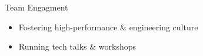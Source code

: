 \documentclass[a4paper,10pt]{article}
\newcommand{\subskill}[1]{{\color{vlightblue} #1}}
\begin{document}
{\begin{minipage}[t]{0.24\textwidth}
{\begin{minipage}[t][\textheight]{\dimexpr\textwidth-10pt}



        \subskill{Team Engagment}
        \begin{itemize}[leftmargin=1em, nosep]
            \item Fostering high-performance \& engineering culture
            \item Running tech talks \& workshops
        \end{itemize}
        \vspace{0.5em}


\end{minipage}}
\end{minipage}}
\end{document}
